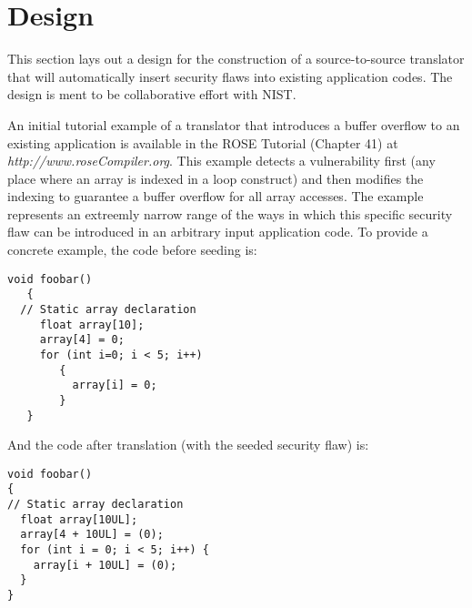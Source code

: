 \section{Design}

   This section lays out a design for the construction of a source-to-source
translator that will automatically insert security flaws into existing application codes.
The design is ment to be collaborative effort with NIST.

An initial tutorial example of a translator that introduces a 
buffer overflow to an existing application is available in the ROSE Tutorial
(Chapter 41) at {\em http://www.roseCompiler.org}.  This example detects a
vulnerability first (any place where an array is indexed in a loop construct)
and then modifies the indexing to guarantee a buffer overflow for all
array accesses.  The example represents an extreemly narrow range of
the ways in which this specific security flaw can be introduced in an
arbitrary input application code.  To provide a concrete example, the code 
before seeding is:
{\mySmallFontSize
\begin{verbatim}
void foobar()
   {
  // Static array declaration
     float array[10];
     array[4] = 0;
     for (int i=0; i < 5; i++)
        {
          array[i] = 0;
        }
   }
\end{verbatim}
}
And the code after translation (with the seeded security flaw) is:
{\mySmallFontSize
\begin{verbatim}
void foobar()
{
// Static array declaration
  float array[10UL];
  array[4 + 10UL] = (0);
  for (int i = 0; i < 5; i++) {
    array[i + 10UL] = (0);
  }
}
\end{verbatim}
}

